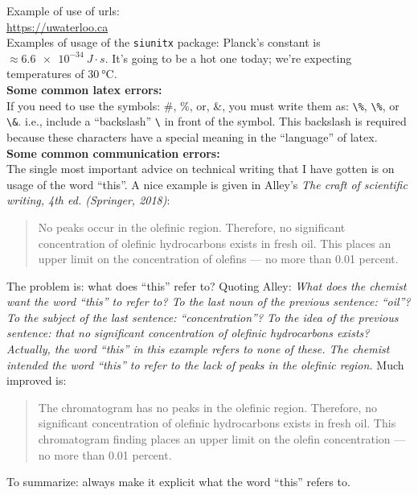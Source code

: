 \documentclass[11pt,usenames,dvipsnames]{article}
\begin{document}
\noindent
Example of use of urls: \\ \url{https://uwaterloo.ca}\\

\noindent
Examples of usage of the \verb$siunitx$ package: Planck's constant is $ \approx \SI{6.6e-34}{J \cdot s}$.  It's going to be a hot one today; we're expecting temperatures of $\SI{30}{\celsius}$.\\

\noindent
{\bf Some common latex errors:}\\

\noindent
If you need to use the symbols: \#, \%, or, \&, you must write them as: \verb$\%$, \verb$\%$, or \verb$\&$.  i.e., include a ``backslash'' \verb$\$ in front of the symbol.  This backslash is required because these characters have a special meaning in the ``language'' of latex.\\

\noindent
{\bf Some common communication errors:}\\

\noindent
The single most important advice on technical writing that I have gotten is on usage of the word ``this''.  A nice example is given in Alley's {\em The craft of scientific writing, 4th ed. (Springer, 2018)}:
\begin{quotation}
No peaks occur in the olefinic region. Therefore, no significant concentration of olefinic hydrocarbons exists in fresh oil. This places an upper limit on the concentration of olefins --- no more than 0.01 percent.
\end{quotation}
The problem is: what does ``this'' refer to?  Quoting Alley: \textit{What does the chemist want the word ``this'' to refer to? To the last noun of the previous sentence: ``oil''? To the subject of the last sentence: ``concentration''? To the idea of the previous sentence: that no significant concentration of olefinic hydrocarbons exists? Actually, the word ``this'' in this example refers to none of these. The chemist intended the word ``this'' to refer to the lack of peaks in the olefinic region.}
Much improved is:
\begin{quotation}
The chromatogram has no peaks in the olefinic region. Therefore, no significant concentration of olefinic hydrocarbons exists in fresh oil. This chromatogram finding places an upper limit on the olefin concentration --- no more than 0.01 percent.
\end{quotation}
To summarize: always make it explicit what the word ``this'' refers to.
\end{document}
